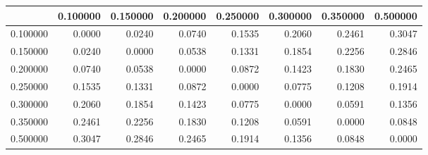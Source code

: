 \begin{tabular}{lrrrrrrr}
\toprule
 & 0.100000 & 0.150000 & 0.200000 & 0.250000 & 0.300000 & 0.350000 & 0.500000 \\
\midrule
0.100000 & 0.0000 & 0.0240 & 0.0740 & 0.1535 & 0.2060 & 0.2461 & 0.3047 \\
0.150000 & 0.0240 & 0.0000 & 0.0538 & 0.1331 & 0.1854 & 0.2256 & 0.2846 \\
0.200000 & 0.0740 & 0.0538 & 0.0000 & 0.0872 & 0.1423 & 0.1830 & 0.2465 \\
0.250000 & 0.1535 & 0.1331 & 0.0872 & 0.0000 & 0.0775 & 0.1208 & 0.1914 \\
0.300000 & 0.2060 & 0.1854 & 0.1423 & 0.0775 & 0.0000 & 0.0591 & 0.1356 \\
0.350000 & 0.2461 & 0.2256 & 0.1830 & 0.1208 & 0.0591 & 0.0000 & 0.0848 \\
0.500000 & 0.3047 & 0.2846 & 0.2465 & 0.1914 & 0.1356 & 0.0848 & 0.0000 \\
\bottomrule
\end{tabular}
